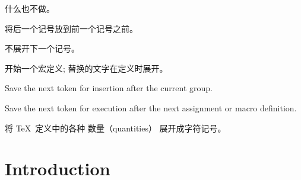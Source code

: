 \documentclass{book}
\begin{document}
\begin{inventory}
\item [\cs{relax}] 
     什么也不做。


\item [\cs{expandafter}]  
	   将后一个记号放到前一个记号之前。

\item [\cs{noexpand}]   
      不展开下一个记号。


\item [\cs{edef}] 
      开始一个宏定义;
      替换的文字在定义时展开。

% 
 
\item [\cs{aftergroup}]  
      Save the next token for insertion after the current group.

\item [\cs{afterassignment}]   
      Save the next token for execution after the next assignment
      or macro definition.


\item [\cs{the}] 
      将 \TeX\ 定义中的各种 数量（quantities） 展开成字符记号。

\end{inventory}


\section{Introduction}
\end{document}
